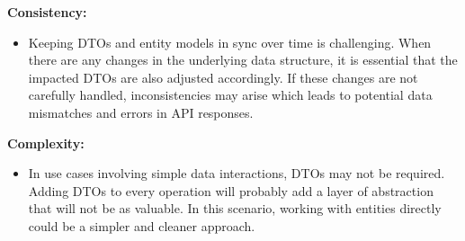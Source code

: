     \textbf{Consistency:}
    \begin{itemize}
        \item Keeping DTOs and entity models in sync over time is challenging. When there are any changes in the underlying data structure, it is essential that the impacted DTOs are also adjusted accordingly. If these changes are not carefully handled, inconsistencies may arise which leads to potential data mismatches and errors in API responses.
    \end{itemize}
    \textbf{Complexity:}
    \begin{itemize}
        \item In use cases involving simple data interactions, DTOs may not be required. Adding DTOs to every operation will probably add a layer of abstraction that will not be as valuable. In this scenario, working with entities directly could be a simpler and cleaner approach.
    \end{itemize} \Autocite{Andi:DTOs}